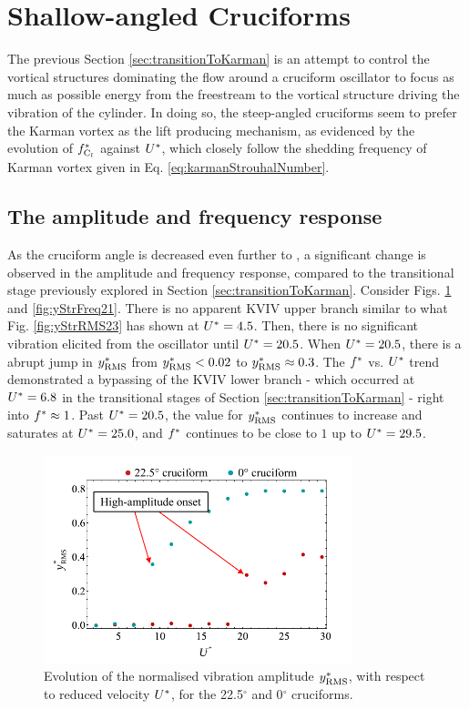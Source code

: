 \documentclass[oneside]{utmthesis}
\begin{document}
\section{Shallow-angled Cruciforms}\label{sec:kvivRegime}

The previous Section \ref{sec:transitionToKarman} is an attempt to control the vortical structures dominating the flow around a cruciform oscillator to focus as much as possible energy from the freestream to the vortical structure driving the vibration of the cylinder. In doing so, the steep-angled cruciforms seem to prefer the Karman vortex as the lift producing mechanism, as evidenced by the evolution of $f_{\text{C}_{l}}^{*}$ against $U^{*}$, which closely follow the shedding frequency of Karman vortex given in Eq. \ref{eq:karmanStrouhalNumber}.

\subsection{The amplitude and frequency response}\label{ssec:kvivAmpFreqResp}

As the cruciform angle is decreased even further to \angtw{}, a significant change is observed in the amplitude and frequency response, compared to the transitional stage previously explored in Section \ref{sec:transitionToKarman}. Consider Figs. \ref{fig:yStrRMS45} and \ref{fig:yStrFreq21}. There is no apparent KVIV upper branch similar to what  Fig. \ref{fig:yStrRMS23} has shown at $U^{*} = 4.5$. Then, there is no significant vibration elicited from the oscillator until $U^{*} = 20.5$. When $U^{*} = 20.5$, there is a abrupt jump in $y^{*}_{\text{RMS}}$ from $y^{*}_{\text{RMS}} < 0.02$ to $y^{*}_{\text{RMS}} \approx 0.3$. The $f^{*}$ vs. $U^{*}$ trend demonstrated a bypassing of the KVIV lower branch - which occurred at $U^{*} = 6.8$ in the transitional stages of Section \ref{sec:transitionToKarman} - right into $f^{*} \approx 1$. Past $U^{*} = 20.5$, the value for $y^{*}_{\text{RMS}}$ continues to increase and saturates at $U^{*} = 25.0$, and $f^{*}$ continues to be close to $1$ up to $U^{*} = 29.5$.

\begin{figure}[H]
  \centering
  \includegraphics[width=0.8\textwidth]{figs/yStrRMS45}
  \caption{Evolution of the normalised vibration amplitude $y^{*}_{\text{RMS}}$, with respect to reduced velocity $U^{*}$, for the 22.5$^{\circ}$ and 0$^{\circ}$ cruciforms.}
  \label{fig:yStrRMS45}
\end{figure}
\end{document}
